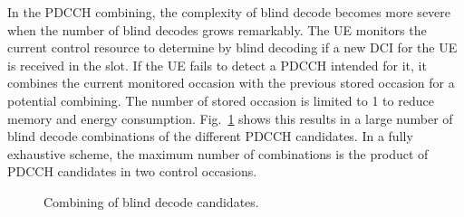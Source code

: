 \documentclass[conference,10pt]{IEEEtran}
\begin{document}
In the PDCCH combining, the complexity of blind decode becomes more severe when the number of blind decodes grows remarkably. The UE monitors the current control resource to determine by blind decoding if a new DCI for the UE is received in the slot. If the UE fails to detect a PDCCH intended for it, it combines the current monitored occasion with the previous stored occasion for a potential combining. The number of stored occasion is limited to 1 to reduce memory and energy consumption. Fig.~\ref{fig4} shows this results in a large number of blind decode combinations of the different PDCCH candidates. In a fully exhaustive scheme, the maximum number of combinations is the product of PDCCH candidates in two control occasions. 

\begin{figure}[htbp]
\centering
{}
\hfill
\qquad
{}
\hfill

\caption{Combining of blind decode candidates.}
\label{fig4}
\end{figure}
\end{document}
